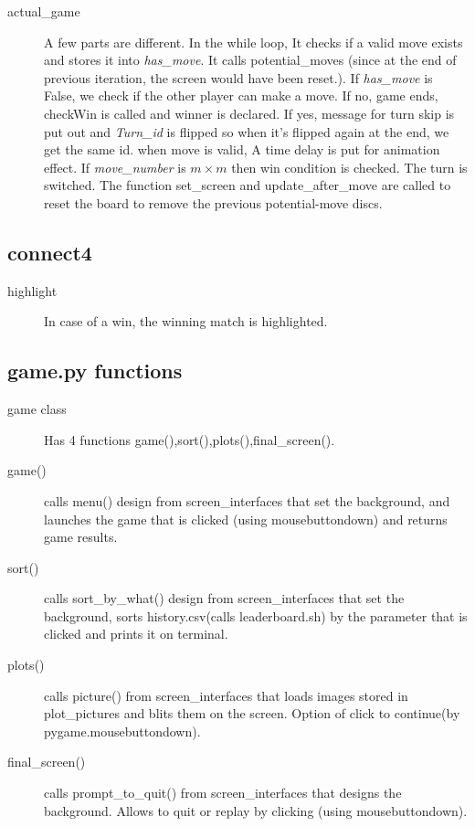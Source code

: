 \documentclass[12pt]{article}
\begin{document}
\begin{description}
    \item[actual\_game] A few parts are different. In the while loop, It checks if a valid move exists and stores it into \textit{has\_move}. It calls potential\_moves (since at the end of previous iteration, the screen would have been reset.). 
    If \textit{has\_move} is False, we check if the other player can make a move. If no, game ends, checkWin is called and winner is declared. If yes, message for turn skip is put out and \textit{Turn\_id} is flipped so when it's flipped again at the end, we get the same id. when move is valid, A time delay is put for animation effect.
    If \textit{move\_number} is $m \times m$ then win condition is checked. The turn is switched. The function set\_screen and update\_after\_move are called to reset the board to remove the previous potential-move discs. 
     
\end{description}

\subsection{connect4}
\begin{description}
    \item[highlight] In case of a win, the winning match is highlighted. 
\end{description}

\subsection{game.py functions}
\begin{description}
    \item[game class] Has 4 functions game(),sort(),plots(),final\_screen().
    \item[game()] calls menu() design from screen\_interfaces that set the background, and launches the game that is clicked (using mousebuttondown) and returns game results.
    \item[sort()] calls sort\_by\_what() design from screen\_interfaces that set the background, sorts history.csv(calls leaderboard.sh) by the parameter that is clicked and prints it on terminal.
    \item[plots()] calls picture() from screen\_interfaces that loads images stored in plot\_pictures and blits them on the screen. Option of click to continue(by pygame.mousebuttondown).
    \item[final\_screen()] calls prompt\_to\_quit() from screen\_interfaces that designs the background. Allows to quit or replay by clicking (using mousebuttondown).
\end{description}
\end{document}
